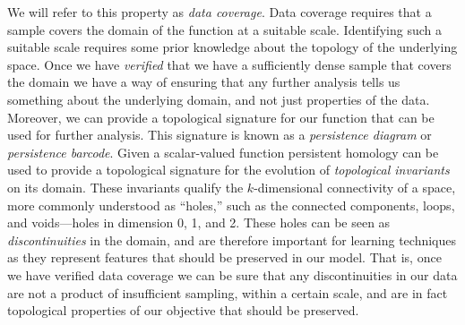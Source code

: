 We will refer to this property as \emph{data coverage}.
Data coverage requires that a sample covers the domain of the function at a suitable scale.
Identifying such a suitable scale requires some prior knowledge about the topology of the underlying space.
Once we have \emph{verified} that we have a sufficiently dense sample that covers the domain we have a way of ensuring that any further analysis tells us something about the underlying domain, and not just properties of the data.
Moreover, we can provide a topological signature for our function that can be used for further analysis.
This signature is known as a \emph{persistence diagram} or \emph{persistence barcode}.
Given a scalar-valued function persistent homology can be used to provide a topological signature for the evolution of \emph{topological invariants} on its domain.
These invariants qualify the $k$-dimensional connectivity of a space, more commonly understood as ``holes,'' such as the connected components, loops, and voids---holes in dimension 0, 1, and 2.
These holes can be seen as \emph{discontinuities} in the domain, and are therefore important for learning techniques as they represent features that should be preserved in our model.
That is, once we have verified data coverage we can be sure that any discontinuities in our data are not a product of insufficient sampling, within a certain scale, and are in fact topological properties of our objective that should be preserved.


